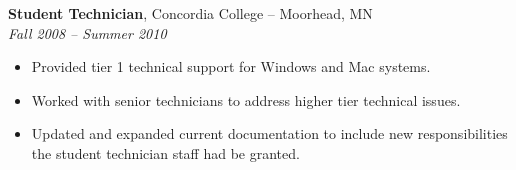 {\bf Student Technician}, Concordia College -- Moorhead, MN\\
{\it Fall 2008 – Summer 2010}
\begin{itemize}
	\item Provided tier 1 technical support for Windows and Mac systems.
	\item Worked with senior technicians to address higher tier technical issues.
	\item Updated and expanded current documentation to include new responsibilities the student technician staff had be granted.
\end{itemize}